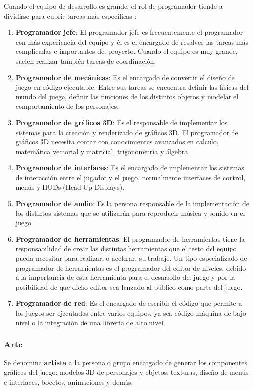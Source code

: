 Cuando el equipo de desarrollo es grande, el rol de programador tiende a dividirse para cubrir tareas más específicas \cite{development_and_production}:
\begin{enumerate}
\item \textbf{Programador jefe}: El programador jefe es frecuentemente el programador con más experiencia del equipo y él es el encargado de resolver las tareas más complicadas e importantes del proyecto. Cuando el equipo es muy grande, suelen realizar también tareas de coordinación.
\item \textbf{Programador de mecánicas}: Es el encargado de convertir el diseño de juego en código ejecutable. Entre sus tareas se encuentra definir las físicas del mundo del juego, definir las funciones de los distintos objetos y modelar el comportamiento de los personajes.
\item \textbf{Programador de gráficos 3D}: Es el responsable de implementar los sistemas para la creación y renderizado de gráficos 3D. El programador de gráficos 3D necesita contar con conocimientos avanzados en calculo, matemática vectorial y matricial, trigonometría y álgebra.
\item \textbf{Programador de interfaces}: Es el encargado de implementar los sistemas de interacción entre el jugador y el juego, normalmente interfaces de control, menús y HUDs (Head-Up Displays). 
\item \textbf{Programador de audio}: Es la persona responsable de la implementación de los distintos sistemas que se utilizarán para reproducir música y sonido en el juego
\item \textbf{Programador de herramientas}: El programador de herramientas tiene la responsabilidad de crear las distintas herramientas que el resto del equipo pueda necesitar para realizar, o acelerar, su trabajo. Un tipo especializado de programador de herramientas es el programador del editor de niveles, debido a la importancia de esta herramienta para el desarrollo del juego y por la posibilidad de que dicho editor sea lanzado al público como parte del juego.
\item \textbf{Programador de red}: Es el encargado de escribir el código que permite a los juegos ser ejecutados entre varios equipos, ya sea código máquina de bajo nivel o la integración de una librería de alto nivel.
\end{enumerate}

\subsubsection{Arte}
Se denomina \textbf{artista} a la persona o grupo encargado de generar los componentes gráficos del juego: modelos 3D de personajes y objetos, texturas, diseño de menús e interfaces, bocetos, animaciones y demás.

